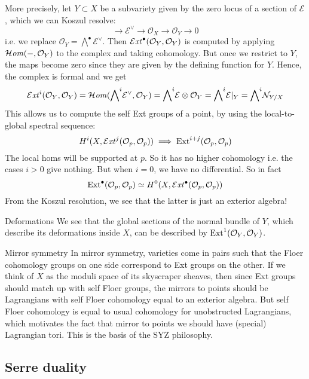 More precisely, let $Y\subset X$ be a subvariety given by the zero locus of a section of $\mathcal{E}$, which we can Koszul resolve: $$\xrightarrow{}\mathcal{E}^\lor\xrightarrow{}\mathcal{O}_{X}\xrightarrow{}\mathcal{O}_{Y}\xrightarrow{}0$$i.e. we replace $\mathcal{O}_{Y}={\bigwedge}^\bullet \mathcal{E}^\lor$. Then
$\operatorname{\mathcal{E}\mathit{xt}}^\bullet(\mathcal{O}_{Y},\mathcal{O}_{Y})$ is computed by applying $\operatorname{\mathcal{H}\mathit{om}}(-,\mathcal{O}_{Y})$ to the complex and taking cohomology. But once we restrict to $Y$, the maps become zero since they are given by the defining function for $Y$. Hence, the complex is formal and we get $$\operatorname{\mathcal{E}\mathit{xt}}^i(\mathcal{O}_{Y},\mathcal{O}_{Y})=\operatorname{\mathcal{H}\mathit{om}}({\bigwedge}^i \mathcal{E}^\lor, \mathcal{O}_{Y})={\bigwedge}^i \mathcal{E} \otimes \mathcal{O}_{Y}={\bigwedge}^i \mathcal{E}|_{Y}={\bigwedge}^i \mathcal{N}_{{Y/X}}$$ This allows us to compute the self Ext groups of a point, by using the local-to-global spectral sequence:$$H^i(X, \operatorname{\mathcal{E}\mathit{xt}}^j(\mathcal{O}_{p}, \mathcal{O}_{p}))\implies \mathrm{Ext}^{i+j}(\mathcal{O}_{p}, \mathcal{O}_{p})$$The local homs will be supported at $p$. So it has no higher cohomology i.e. the cases $i>0$ give nothing. But when $i=0$, we have no differential. So in fact $$\mathrm{Ext}^\bullet(\mathcal{O}_{p}, \mathcal{O}_{p})\simeq H^0(X, \operatorname{\mathcal{E}\mathit{xt}}^\bullet(\mathcal{O}_{p}, \mathcal{O}_{p}))$$
From the Koszul resolution, we see that the latter is just an exterior algebra!
\begin{remark}{Deformations}{}
    We see that the global sections of the normal bundle of $Y$, which describe its deformations inside $X$, can be described by $\operatorname{Ext}^1(\mathcal{O}_Y,\mathcal{O}_Y)$. 
\end{remark}
\begin{remark}{Mirror symmetry}{}
    In mirror symmetry, varieties come in pairs such that the Floer cohomology groups on one side correspond to Ext groups on the other. If we think of $X$ as the moduli space of its skyscraper sheaves, then since Ext groups should match up with self Floer groups, the mirrors to points should be Lagrangians with self Floer cohomology equal to an exterior algebra. But self Floer cohomology is equal to usual cohomology for unobstructed Lagrangians, which motivates the fact that mirror to points we should have (special) Lagrangian tori. This is the basis of the SYZ philosophy.
    
\end{remark}

\subsection{Serre duality}

